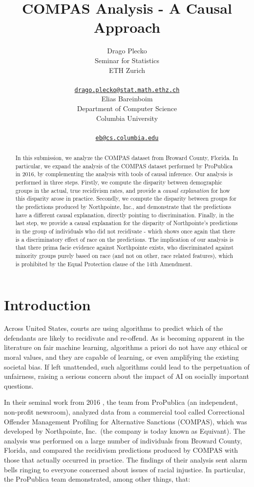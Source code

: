 \documentclass{article}
\title{COMPAS Analysis - A Causal Approach}
\author{
    Drago Plecko
   \\
    Seminar for Statistics \\
    ETH Zurich \\
   \\
  \texttt{\href{mailto:drago.plecko@stat.math.ethz.ch}{\nolinkurl{drago.plecko@stat.math.ethz.ch}}} \\
   \And
    Elias Bareinboim
   \\
    Department of Computer Science \\
    Columbia University \\
   \\
  \texttt{\href{mailto:eb@cs.columbia.edu}{\nolinkurl{eb@cs.columbia.edu}}} \\
  }
\begin{document}
\maketitle


\begin{abstract}
In this submission, we analyze the COMPAS dataset from Broward County,
Florida. In particular, we expand the analysis of the COMPAS dataset
performed by ProPublica in 2016, by complementing the analysis with
tools of causal inference. Our analysis is performed in three steps.
Firstly, we compute the disparity between demographic groups in the
actual, true recidivism rates, and provide a \emph{causal explanation}
for how this disparity arose in practice. Secondly, we compute the
disparity between groups for the predictions produced by Northpointe,
Inc., and demonstrate that the predictions have a different causal
explanation, directly pointing to discrimination. Finally, in the last
step, we provide a causal explanation for the disparity of Northpointe's
predictions in the group of individuals who did not recidivate - which
shows once again that there is a discriminatory effect of race on the
predictions. The implication of our analysis is that there prima facie
evidence against Northpointe exists, who discriminated against minority
groups purely based on race (and not on other, race related features),
which is prohibited by the Equal Protection clause of the 14th
Amendment.
\end{abstract}


\hypertarget{introduction}{%
\section{Introduction}\label{introduction}}

Across United States, courts are using algorithms to predict which of
the defendants are likely to recidivate and re-offend. As is becoming
apparent in the literature on fair machine learning, algorithms a priori
do not have any ethical or moral values, and they are capable of
learning, or even amplifying the existing societal bias. If left
unattended, such algorithms could lead to the perpetuation of
unfairness, raising a serious concern about the impact of AI on socially
important questions.

In their seminal work from 2016 \cite{larson2016recidivism}, the team
from ProPublica (an independent, non-profit newsroom), analyzed data
from a commercial tool called Correctional Offender Management Profiling
for Alternative Sanctions (COMPAS), which was developed by Northpointe,
Inc.~(the company is today known as Equivant). The analysis was
performed on a large number of individuals from Broward County, Florida,
and compared the recidivism predictions produced by COMPAS with those
that actually occurred in practice. The findings of their analysis sent
alarm bells ringing to everyone concerned about issues of racial
injustice. In particular, the ProPublica team demonstrated, among other
things, that:
\end{document}
